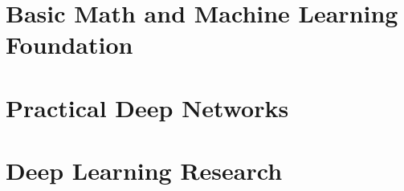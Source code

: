 \documentclass[10pt,\papersize,twoside,openright]{book}
\theoremstyle{definition}
\theoremstyle{remark}
\begin{document}
\mainmatter



\part{Basic Math and Machine Learning Foundation}









\part{Practical Deep Networks}















\part{Deep Learning Research}
\end{document}
